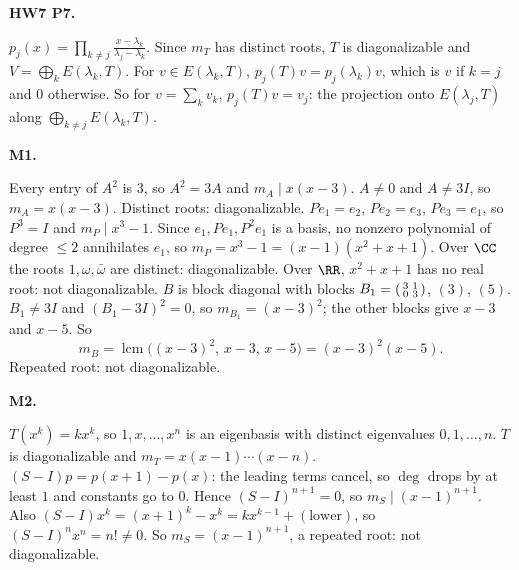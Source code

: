 \documentclass[10pt]{scrartcl}
\begin{document}
\begin{prob}
\textbf{HW7 P7. }\par 
{}
$p_j(x)=\prod_{k\ne j}\frac{x-\lambda_k}{\lambda_j-\lambda_k}$. Since $m_T$ has distinct roots, $T$ is diagonalizable and $V=\bigoplus_kE(\lambda_k,T)$. For $v\in E(\lambda_k,T)$, $p_j(T)v=p_j(\lambda_k)v$, which is $v$ if $k=j$ and $0$ otherwise. So for $v=\sum_kv_k$, $p_j(T)v=v_j$: the projection onto $E(\lambda_j,T)$ along $\bigoplus_{k\ne j}E(\lambda_k,T)$.
\end{prob}

\begin{prob}
\textbf{M1. }\par 
{}
\begin{enumerate}[(a)]
  \ii Every entry of $A^2$ is $3$, so $A^2=3A$ and $m_A\mid x(x-3)$. $A\ne0$ and $A\ne3I$, so $m_A=x(x-3)$. Distinct roots: diagonalizable.
  \ii $Pe_1=e_2$, $Pe_2=e_3$, $Pe_3=e_1$, so $P^3=I$ and $m_P\mid x^3-1$. Since $e_1,Pe_1,P^2e_1$ is a basis, no nonzero polynomial of degree $\le2$ annihilates $e_1$, so $m_P=x^3-1=(x-1)(x^2+x+1)$. Over $\CC$ the roots $1,\omega,\bar\omega$ are distinct: diagonalizable. Over $\RR$, $x^2+x+1$ has no real root: not diagonalizable.
  \ii $B$ is block diagonal with blocks $B_1=\begin{psmallmatrix}3&1\\0&3\end{psmallmatrix}$, $(3)$, $(5)$. $B_1\ne3I$ and $(B_1-3I)^2=0$, so $m_{B_1}=(x-3)^2$; the other blocks give $x-3$ and $x-5$. So \[ m_B=\operatorname{lcm}\big((x-3)^2,\,x-3,\,x-5\big)=(x-3)^2(x-5). \] Repeated root: not diagonalizable.
\end{enumerate}
\end{prob}

\begin{prob}
\textbf{M2. }\par 
\begin{enumerate}[(a)]
  \ii {}
  $T(x^k)=kx^k$, so $1,x,\dots,x^n$ is an eigenbasis with distinct eigenvalues $0,1,\dots,n$. $T$ is diagonalizable and $m_T=x(x-1)\cdots(x-n)$.
  \ii {}
  $(S-I)p=p(x+1)-p(x)$: the leading terms cancel, so $\deg$ drops by at least $1$ and constants go to $0$. Hence $(S-I)^{n+1}=0$, so $m_S\mid(x-1)^{n+1}$. Also $(S-I)x^k=(x+1)^k-x^k=kx^{k-1}+(\text{lower})$, so $(S-I)^nx^n=n!\ne0$. So $m_S=(x-1)^{n+1}$, a repeated root: not diagonalizable.
\end{enumerate}
\end{prob}
\end{document}

